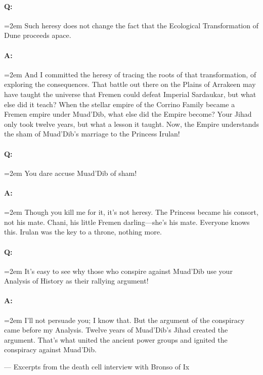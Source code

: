\documentclass[a4paper, 12pt, oldfontcommands, final]{memoir}
\begin{document}
\paragraph{Q:} \hangindent=2em Such heresy does not change the fact that the Ecological Transformation of Dune proceeds apace.
\paragraph{A:} \hangindent=2em And I committed the heresy of tracing the roots of that transformation, of exploring the consequences. That battle out there on the Plains of Arrakeen may have taught the universe that Fremen could defeat Imperial Sardaukar, but what else did it teach? When the stellar empire of the Corrino Family became a Fremen empire under Muad'Dib, what else did the Empire become? Your Jihad only took twelve years, but what a lesson it taught. Now, the Empire understands the sham of Muad'Dib's marriage to the Princess Irulan!
\paragraph{Q:} \hangindent=2em You dare accuse Muad'Dib of sham!
\paragraph{A:} \hangindent=2em Though you kill me for it, it's not heresy. The Princess became his consort, not his mate. Chani, his little Fremen darling---she's his mate. Everyone knows this. Irulan was the key to a throne, nothing more.
\paragraph{Q:} \hangindent=2em It's easy to see why those who conspire against Muad'Dib use your Analysis of History as their rallying argument!
\paragraph{A:} \hangindent=2em I'll not persuade you; I know that. But the argument of the conspiracy came before my Analysis. Twelve years of Muad'Dib's Jihad created the argument. That's what united the ancient power groups and ignited the conspiracy against Muad'Dib.
\begin{adjustwidth}{1.5em}{}\small
\vspace{10pt}
--- Excerpts from the death cell interview with Bronso of Ix
\end{adjustwidth}
\end{document}
